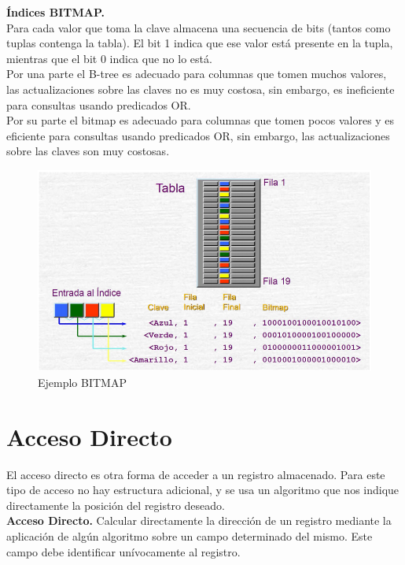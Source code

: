 \documentclass[a4paper,11pt]{article}
\begin{document}
\textbf{Índices BITMAP.} \\

Para cada valor que toma la clave almacena una secuencia de bits (tantos como tuplas contenga la tabla). El bit 1 indica que ese valor está presente en la tupla, mientras que el bit 0 indica que no lo está. \\

Por una parte el B-tree es adecuado para columnas que tomen muchos valores, las actualizaciones sobre las claves no es muy costosa, sin embargo, es ineficiente para consultas usando predicados OR.\\

Por su parte el bitmap es adecuado para columnas que tomen pocos valores y es eficiente para consultas usando predicados OR, sin embargo, las actualizaciones sobre las claves son muy costosas.

\begin{figure}[h]
\centering
\caption{Ejemplo BITMAP}
\includegraphics[scale=1,width=1\textwidth]{ejemplo_BITMAP.png}
\end{figure}

\section{Acceso Directo}
El acceso directo es otra forma de acceder a un registro almacenado. Para este tipo de acceso no hay estructura adicional, y se usa un algoritmo que nos indique directamente la posición del registro deseado. \\

\textbf{Acceso Directo.} Calcular directamente la dirección de un registro mediante la aplicación de algún algoritmo sobre un campo determinado del mismo. Este campo debe identificar unívocamente al registro. \\
\end{document}
